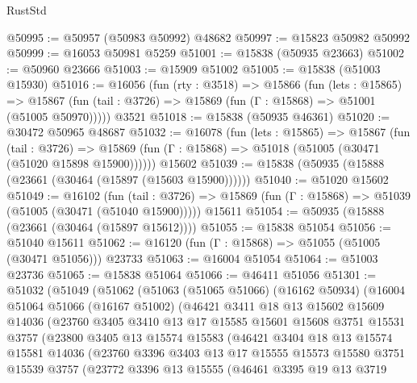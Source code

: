 \begin{lexlean}{RustStd}
\begin{coremodule}
@50995 := @50957 (@50983 @50992) @48682
@50997 := @15823 @50982 @50992
@50999 := @16053 @50981 @5259
@51001 := @15838 (@50935 @23663)
@51002 := @50960 @23666
@51003 := @15909 @51002
@51005 := @15838 (@51003 @15930)
@51016 := @16056
    (fun (rty : @3518) =>
    @15866
      (fun (lets : @15865) =>
      @15867 (fun (tail : @3726) => @15869 (fun (Γ : @15868) => @51001 (@51005 @50970)))))
    @3521
@51018 := @15838 (@50935 @46361)
@51020 := @30472 @50965 @48687
@51032 := @16078
    (fun (lets : @15865) =>
    @15867
      (fun (tail : @3726) =>
      @15869 (fun (Γ : @15868) => @51018 (@51005 (@30471 (@51020 @15898 @15900))))))
    @15602
@51039 := @15838 (@50935 (@15888 (@23661 (@30464 (@15897 (@15603 @15900))))))
@51040 := @51020 @15602
@51049 := @16102
    (fun (tail : @3726) => @15869 (fun (Γ : @15868) => @51039 (@51005 (@30471 (@51040 @15900)))))
    @15611
@51054 := @50935 (@15888 (@23661 (@30464 (@15897 @15612))))
@51055 := @15838 @51054
@51056 := @51040 @15611
@51062 := @16120 (fun (Γ : @15868) => @51055 (@51005 (@30471 @51056))) @23733
@51063 := @16004 @51054
@51064 := @51003 @23736
@51065 := @15838 @51064
@51066 := @46411 @51056
@51301 := @51032
    (@51049
      (@51062
        (@51063
          (@51065 @51066)
          (@16162 @50934)
          (@16004
            @51064
            @51066
            (@16167 @51002)
            (@46421
              @3411
              @18
              @13
              @15602
              @15609
              @14036
              (@23760
                @3405
                @3410
                @13
                @17
                @15585
                @15601
                @15608
                @3751
                @15531
                @3757
                (@23800
                  @3405
                  @13
                  @15574
                  @15583
                  (@46421
                    @3404
                    @18
                    @13
                    @15574
                    @15581
                    @14036
                    (@23760
                      @3396
                      @3403
                      @13
                      @17
                      @15555
                      @15573
                      @15580
                      @3751
                      @15539
                      @3757
                      (@23772
                        @3396
                        @13
                        @15555
                        (@46461
                          @3395
                          @19
                          @13
                          @3719

\end{coremodule}
\end{lexlean}
